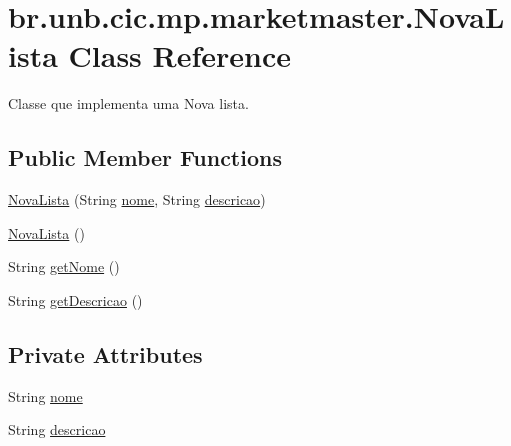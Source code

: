 \hypertarget{classbr_1_1unb_1_1cic_1_1mp_1_1marketmaster_1_1NovaLista}{}\section{br.\+unb.\+cic.\+mp.\+marketmaster.\+Nova\+Lista Class Reference}
\label{classbr_1_1unb_1_1cic_1_1mp_1_1marketmaster_1_1NovaLista}


Classe que implementa uma Nova lista.  


\subsection*{Public Member Functions}
\begin{DoxyCompactItemize}
\item 
\mbox{\hyperlink{classbr_1_1unb_1_1cic_1_1mp_1_1marketmaster_1_1NovaLista_a304bb22abceea4287c659ac56ea0b11d}{Nova\+Lista}} (String \mbox{\hyperlink{classbr_1_1unb_1_1cic_1_1mp_1_1marketmaster_1_1NovaLista_ad14f3bcef37ea464594a6353c6fb6d8e}{nome}}, String \mbox{\hyperlink{classbr_1_1unb_1_1cic_1_1mp_1_1marketmaster_1_1NovaLista_afd41e5e1934bb991ff0726a2896515ec}{descricao}})
\item 
\mbox{\hyperlink{classbr_1_1unb_1_1cic_1_1mp_1_1marketmaster_1_1NovaLista_abedf524eeb1b3a58fe149f47ca84b6d0}{Nova\+Lista}} ()
\item 
String \mbox{\hyperlink{classbr_1_1unb_1_1cic_1_1mp_1_1marketmaster_1_1NovaLista_a6f06a2abbc5006ce89e8de1f05e586b4}{get\+Nome}} ()
\item 
String \mbox{\hyperlink{classbr_1_1unb_1_1cic_1_1mp_1_1marketmaster_1_1NovaLista_aa3ec2efe122d59bbc97847c4e4415e12}{get\+Descricao}} ()
\end{DoxyCompactItemize}
\subsection*{Private Attributes}
\begin{DoxyCompactItemize}
\item 
String \mbox{\hyperlink{classbr_1_1unb_1_1cic_1_1mp_1_1marketmaster_1_1NovaLista_ad14f3bcef37ea464594a6353c6fb6d8e}{nome}}
\item 
String \mbox{\hyperlink{classbr_1_1unb_1_1cic_1_1mp_1_1marketmaster_1_1NovaLista_afd41e5e1934bb991ff0726a2896515ec}{descricao}}
\end{DoxyCompactItemize}


